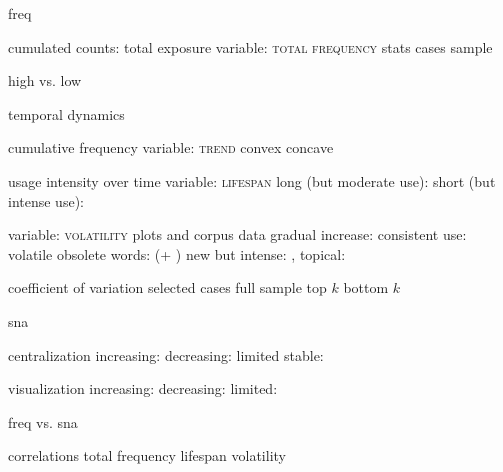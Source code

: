 
freq

  cumulated counts: total exposure
    variable: \textsc{total frequency}
    stats
      cases
      sample

    high vs. low

  temporal dynamics

    cumulative frequency
      variable: \textsc{trend}
        convex
        concave

    usage intensity over time
      variable: \textsc{lifespan}
        long (but moderate use): 
        short (but intense use): 

      variable: \textsc{volatility}
        plots and corpus data
          gradual increase: 
          consistent use: 
          volatile
            obsolete words:  (+ )
            new but intense: , 
            topical: 

        coefficient of variation
          selected cases
          full sample
            top $k$
            bottom $k$

sna

  centralization
    increasing:
    decreasing:
    limited
    stable: 

  visualization
    increasing: 
    decreasing: 
    limited: 

freq vs. sna

  correlations
    total frequency
    lifespan
    volatility
